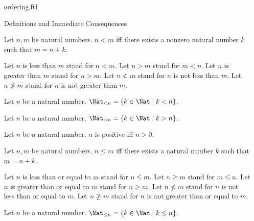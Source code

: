 \documentclass{naproche-library}
\begin{document}
\begin{smodule}[title=The Standard Ordering of the Natural Numbers]{ordering.ftl}

\begin{sfragment}{Definitions and Immediate Consequences}
  \begin{definition}[forthel,id=ARITHMETIC_04_1926295512416256]
    Let $n, m$ be natural numbers.
    $n < m$ iff there exists a nonzero natural number $k$ such that $m = n + k$.

    Let $n$ is less than $m$ stand for $n < m$.
    Let $n > m$ stand for $m < n$.
    Let $n$ is greater than $m$ stand for $n > m$.
    Let $n \nless m$ stand for $n$ is not less than $m$.
    Let $n \ngtr m$ stand for $n$ is not greater than $m$.
  \end{definition}

  \begin{definition}[forthel,id=ARITHMETIC_04_3668680374222848]
    Let $n$ be a natural number.
    $\Nat_{< n} = \{ k \in \Nat \mid k < n \}$.
  \end{definition}

  \begin{definition}[forthel,id=ARITHMETIC_04_3670333934534656]
    Let $n$ be a natural number.
    $\Nat_{> n} = \{ k \in \Nat \mid k > n \}$.
  \end{definition}

  \begin{definition}[forthel,id=ARITHMETIC_04_7916616566177792]
    Let $n$ be a natural number.
    $n$ is positive iff $n > 0$.
\end{definition}

  \begin{definition}[forthel,id=ARITHMETIC_04_4593841531256832]
    Let $n, m$ be natural numbers.
    $n \leq m$ iff there exists a natural number $k$ such that $m = n + k$.

    Let $n$ is less than or equal to $m$ stand for $n \leq m$.
    Let $n \geq m$ stand for $m \leq n$.
    Let $n$ is greater than or equal to $m$ stand for $n \geq m$.
    Let $n \nleq m$ stand for $n$ is not less than or equal to $m$.
    Let $n \ngeq m$ stand for $n$ is not greater than or equal to $m$.
  \end{definition}

  \begin{definition}[forthel,id=ARITHMETIC_04_72501526790144]
    Let $n$ be a natural number.
    $\Nat_{\leq n} = \{ k \in \Nat \mid k \leq n \}$.
  \end{definition}


\end{sfragment}
\end{smodule}
\end{document}
